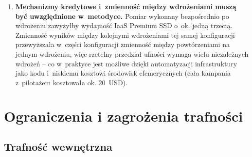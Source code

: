 \begin{enumerate}
  \item \textbf{Mechanizmy kredytowe i~zmienność między wdrożeniami muszą być uwzględnione
  w~metodyce.} Pomiar wykonany bezpośrednio po wdrożeniu zawyżyłby wydajność IaaS Premium SSD
  o~ok. jedną trzecią. Zmienność wyników między kolejnymi wdrożeniami tej samej konfiguracji
  przewyższała w~części konfiguracji zmienność między powtórzeniami na jednym wdrożeniu, więc
  rzetelny przedział ufności wymaga wielu niezależnych wdrożeń -- co w~praktyce jest możliwe
  dzięki automatyzacji infrastruktury jako kodu i~niskiemu kosztowi środowisk efemerycznych
  (cała kampania z~pilotażem kosztowała ok. 20~USD).
\end{enumerate}

\section{Ograniczenia i zagrożenia trafności}
\label{sec:podsumowanie-ograniczenia}

\subsection*{Trafność wewnętrzna}

